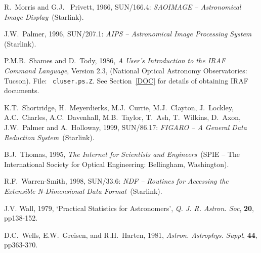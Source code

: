 \documentclass[twoside,11pt]{article}
\newcommand{\xref}[3]{#1}
\begin{document}
\begin{thebibliography}{99}
   R.~Morris and G.J.~ Privett, 1966,
   \xref{SUN/166.4}{sun166}{}: {\it SAOIMAGE -- Astronomical Image
   Display}\, (Starlink).

   J.W.~Palmer, 1996, \xref{SUN/207.1}{sun207}{}:
   {\it AIPS -- Astronomical Image Processing System}\, (Starlink).

   P.M.B.~Shames and D.~Tody, 1986, {\it
   A User's Introduction to the IRAF Command Language}, Version 2.3,
   (National Optical Astronomy Observatories: Tucson).  File: {\tt
   cluser.ps.Z}.  See Section~\ref{DOC} for details of obtaining IRAF
   documents.

   K.T.~Shortridge, H.~Meyerdierks, M.J.~Currie,
   M.J.~Clayton, J.~Lockley, A.C.~Charles, A.C.~Davenhall, M.B.~Taylor,
   T.~Ash, T.~Wilkins, D.~Axon, J.W.~Palmer and A.~Holloway, 1999,
   \xref{SUN/86.17}{sun86}{}: {\it FIGARO -- A General Data Reduction
   System}\, (Starlink).

   B.J.~Thomas, 1995, {\it The Internet for
   Scientists and Engineers}\, (SPIE -- The International Society
   for Optical Engineering: Bellingham, Washington).

   R.F.~Warren-Smith, 1998, \xref{SUN/33.6}{sun33}{}:
   {\it NDF -- Routines for Accessing the Extensible N-Dimensional Data
   Format}\, (Starlink).

   J.V. Wall, 1979, `Practical Statistics for
   Astronomers', {\it Q. J. R. Astron. Soc}, {\bf 20},
   pp138-152.

   D.C.~Wells, E.W.~Greisen, and R.H.~Harten, 1981,
   {\it Astron. Astrophys. Suppl}, {\bf 44}, pp363-370.

\end{thebibliography}

\typeout{  }
\typeout{*****************************************************}
\typeout{  }
\typeout{  }
\typeout{*****************************************************}
\typeout{  }
\end{document}
